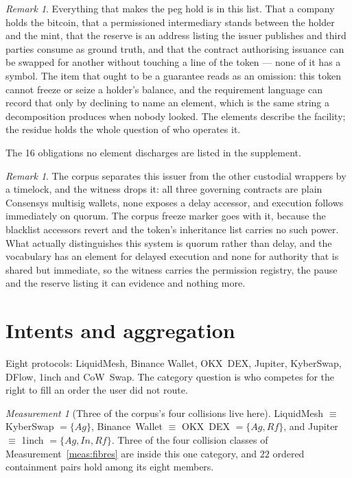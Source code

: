 \documentclass[11pt,reqno]{amsart}
\theoremstyle{plain}
\theoremstyle{definition}
\theoremstyle{remark}
\newtheorem{measurement}[theorem]{Measurement}
\newtheorem{remark}[theorem]{Remark}
\begin{document}
\begin{remark}
Everything that makes the peg hold is in this list. That a company holds the bitcoin, that a permissioned intermediary stands between the holder and the mint, that the reserve is an address listing the issuer publishes and third parties consume as ground truth, and that the contract authorising issuance can be swapped for another without touching a line of the token --- none of it has a symbol. The item that ought to be a guarantee reads as an omission: this token cannot freeze or seize a holder's balance, and the requirement language can record that only by declining to name an element, which is the same string a decomposition produces when nobody looked. The elements describe the facility; the residue holds the whole question of who operates it.

The 16 obligations no element discharges are listed in the supplement.
\end{remark}

\begin{remark}
The corpus separates this issuer from the other custodial wrappers by a timelock, and the witness drops it: all three governing contracts are plain Consensys multisig wallets, none exposes a delay accessor, and execution follows immediately on quorum. The corpus freeze marker goes with it, because the blacklist accessors revert and the token's inheritance list carries no such power. What actually distinguishes this system is quorum rather than delay, and the vocabulary has an element for delayed execution and none for authority that is shared but immediate, so the witness carries the permission registry, the pause and the reserve listing it can evidence and nothing more.
\end{remark}

\section{Intents and aggregation}\label{sec:cat:intent}

Eight protocols: LiquidMesh, Binance Wallet, OKX~DEX, Jupiter, KyberSwap,
DFlow, 1inch and CoW~Swap. The category question is who competes for the right
to fill an order the user did not route.

\begin{measurement}[Three of the corpus's four collisions live here]\label{meas:cat:intentcoll}
LiquidMesh $\equiv$ KyberSwap $= \{Ag\}$, Binance~Wallet $\equiv$ OKX~DEX
$= \{Ag,Rf\}$, and Jupiter $\equiv$ 1inch $= \{Ag,In,Rf\}$. Three of the four
collision classes of Measurement~\ref{meas:fibres} are inside this one
category, and $22$ ordered containment pairs hold among its eight members.
\end{measurement}
\end{document}
